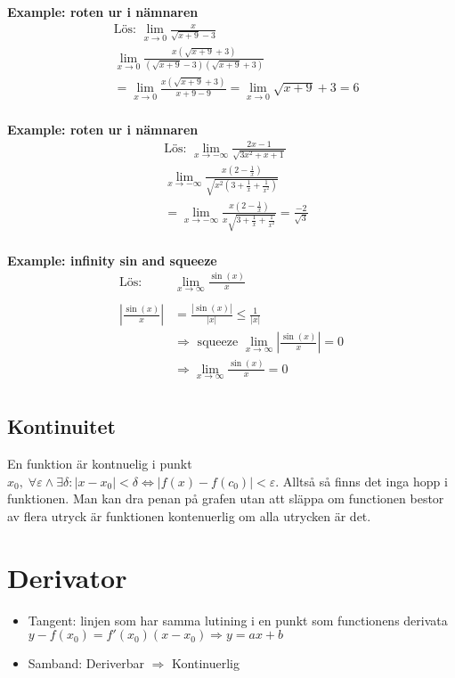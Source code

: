 \begin{multicols}{2}
\textbf{Example: roten ur i nämnaren}
\begin{align*}
  &\text{Lös: } \lim_{x\to 0} \frac{x}{\sqrt{x+9}-3}  \\
  &\lim_{x\to 0} \frac{x(\sqrt{x+9}+3)}{(\sqrt{x+9}-3)(\sqrt{x+9}+3)} \\
  &=\lim_{x\to 0} \frac{x(\sqrt{x+9}+3)}{x+9-9} = \lim_{x\to 0} \sqrt{x+9}+3 = 6 \\
\end{align*}

\textbf{Example: roten ur i nämnaren}
\begin{align*}
  &\text{Lös: } \lim_{x\to-\infty} \frac{2x-1}{\sqrt{3x^2+x+1}}  \\
  &\lim_{x\to-\infty} \frac{x(2-\frac{1}{x})}{\sqrt{x^2(3+\frac{1}{x}+\frac{1}{x^2})}} \\
  &=\lim_{x\to-\infty} \frac{x(2-\frac{1}{x})}{x\sqrt{3+\frac{1}{x}+\frac{1}{x^2}}} = \frac{-2}{\sqrt{3}} \\
\end{align*}

\textbf{Example: infinity sin and squeeze}
\begin{align*}
  \text{Lös: } &\lim_{x\to\infty}\frac{\sin(x)}{x}  \\
  &\\
  |\frac{\sin(x)}{x}| &= \frac{|\sin(x)|}{|x|} \leq \frac{1}{|x|} \\
  &\Rightarrow \text{ squeeze } \lim_{x\to\infty}|\frac{\sin(x)}{x}| = 0  \\
  &\Rightarrow \lim_{x\to\infty}\frac{\sin(x)}{x} = 0  \\
\end{align*}


\subsection{Kontinuitet}
En funktion är kontnuelig i punkt $x_0, \; \forall \varepsilon \land \exists \delta: |x-x_0| < \delta \Leftrightarrow |f(x)-f(c_0)|<\varepsilon$.
Alltså så finns det inga hopp i funktionen. Man kan dra penan på grafen utan att släppa 
om functionen bestor av flera utryck är funktionen kontenuerlig om alla utrycken är det.


\section{Derivator}
\begin{itemize}
  \item Tangent: linjen som har samma lutining i en punkt som functionens derivata
  $y-f(x_0)=f'(x_0)(x-x_0) \Rightarrow y=ax+b$ %
  \item Samband: Deriverbar $\Rightarrow$ Kontinuerlig
\end{itemize}


\end{multicols}
